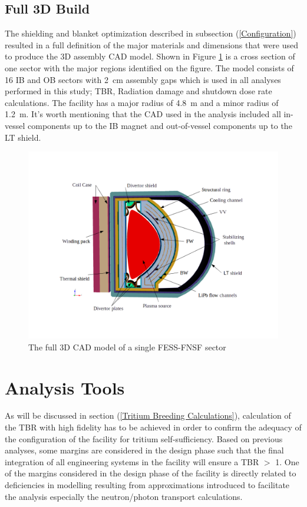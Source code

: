\documentclass[12pt, letterpaper]{elsarticle}
\begin{document}
\subsection{Full 3D Build} \label{Full 3D Build}
The shielding and blanket optimization described in subsection (\ref{Configuration}) resulted in a full definition of the major materials and dimensions that were used to produce the 3D assembly CAD model. Shown in Figure \ref{fig:Full3D} is a cross section of one sector with the major regions identified on the figure. The model consists of 16 IB and OB sectors with \SI{2}{cm} assembly gaps which is used in all analyses performed in this study; TBR, Radiation damage and shutdown dose rate calculations. The facility has a major radius of \SI{4.8}{m} and a minor radius of \SI{1.2}{m}. It's worth mentioning that the CAD used in the analysis included all in-vessel components up to the IB magnet and out-of-vessel components up to the LT shield. 
\begin{figure}[h!]
  \centering
  \includegraphics[scale=0.35]{../plots/full_3d.png}
  \caption{The full 3D CAD model of a single FESS-FNSF sector}
  \label{fig:Full3D}
\end{figure}

\section{Analysis Tools} \label{Analysis Tools}
As will be discussed in section (\ref{Tritium Breeding Calculations}), calculation of the TBR with high fidelity has to be achieved in order to confirm the adequacy of the configuration of the facility for tritium self-sufficiency. Based on previous analyses, some margins are considered in the design phase such that the final integration of all engineering systems in the facility will ensure a TBR $>$ 1. One of the margins \cite{ref_3} considered in the design phase of the facility is directly related to deficiencies in modelling resulting from approximations introduced to facilitate the analysis especially the neutron/photon transport calculations. \vspace{5mm}
\end{document}
